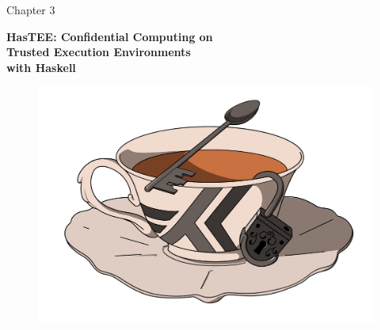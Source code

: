 \documentclass{article}
\begin{document}
\pagecolor{Emerald}

\setlength{\parindent}{0cm}
\LARGE
Chapter 3

\LARGE
\textbf{HasTEE: Confidential Computing on\\Trusted Execution Environments\\with Haskell}

\vspace{5cm}

\begin{figure}[h]
    \centering
    \includegraphics[scale=0.35]{graphics/HasTee_transparent.png}
\end{figure}

\newpage
\mbox{~}
\end{document}
